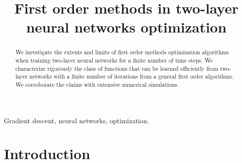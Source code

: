 \documentclass[anon,12pt]{colt2024} %
\title[Short Title]{First order methods in two-layer neural networks optimization}
\begin{document}
\maketitle

\begin{abstract}%
  We investigate the extents and limits of first order methods optimization algorithms when training two-layer neural networks for a finite number of time steps. We characterize rigorously the class of functions that can be learned efficiently from two-layer networks with a finite number of iterations from a general first order algorithms. We corroborate the claims with extensive numerical simulations.     %
\end{abstract}

\begin{keywords}%
Gradient descent, neural networks, optimization.
\end{keywords}

\section{Introduction}
\end{document}
